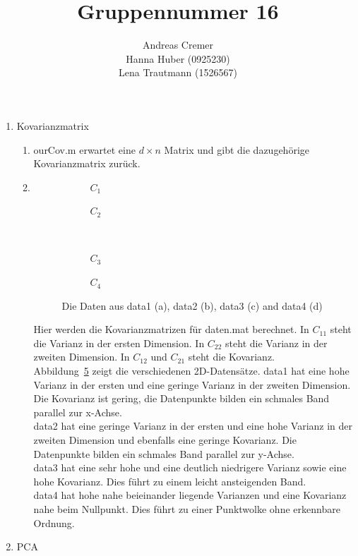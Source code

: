 \documentclass[]{report}
\title{Gruppennummer 16}
\author{Andreas Cremer\\Hanna Huber (0925230) \\Lena Trautmann (1526567)}
\newlength\figureheight
\newlength\figurewidth
\begin{document}
	\maketitle
	
	
	\begin{enumerate}
		\item Kovarianzmatrix
		\begin{enumerate}
			\item
			ourCov.m erwartet eine $d \times n$ Matrix und gibt die dazugehörige Kovarianzmatrix zurück.
			\item
			\setlength\figureheight{5cm}
			\setlength{}
			\begin{figure}
				\begin{subfigure}{0.45\textwidth}
					\centering
					
					\caption{$C_{1}$}
					\label{fig:cov1}
				\end{subfigure}
				\qquad
				\begin{subfigure}{0.45\textwidth}
					\centering
					
					\caption{$C_{2}$}
					\label{fig:cov2}
				\end{subfigure}	
				\\
				\begin{subfigure}{0.45\textwidth}
					\centering
					
					\caption{$C_{3}$}
					\label{fig:cov3}
				\end{subfigure}
				\qquad
				\begin{subfigure}{0.45\textwidth}
					\centering
					
					\caption{$C_{4}$}
					\label{fig:cov4}
				\end{subfigure}	
				\caption{Die Daten aus data1 (a), data2 (b), data3 (c) and data4 (d)}
				\label{fig:cov}
			\end{figure}
			
			Hier werden die Kovarianzmatrizen für daten.mat berechnet. In $C_{11}$ steht die Varianz in der ersten Dimension. In $C_{22}$ steht die Varianz in der zweiten Dimension. In $C_{12}$ und $C_{21}$ steht die Kovarianz.\\
			Abbildung~\ref{fig:cov} zeigt die verschiedenen 2D-Datensätze. data1 hat eine hohe Varianz in der ersten und eine geringe Varianz in der zweiten Dimension. Die Kovarianz ist gering, die Datenpunkte bilden ein schmales Band parallel zur x-Achse.\\
			data2 hat eine geringe Varianz in der ersten und eine hohe Varianz in der zweiten Dimension und ebenfalls eine geringe Kovarianz. Die Datenpunkte bilden ein schmales Band parallel zur y-Achse.\\
			data3 hat eine sehr hohe und eine deutlich niedrigere Varianz sowie eine hohe Kovarianz. Dies führt zu einem leicht ansteigenden Band.\\
			data4 hat hohe nahe beieinander liegende Varianzen und eine Kovarianz nahe beim Nullpunkt. Dies führt zu einer Punktwolke ohne erkennbare Ordnung.
		\end{enumerate}
		\item PCA\\
		

\end{enumerate}
\end{document}
